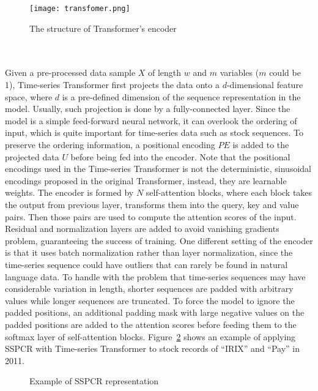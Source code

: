 \begin{figure}[!htbp]
    \centering
    \texttt{[image: transfomer.png]}
    \caption{The structure of Transformer's encoder}
    \label{fig:transformer}
\end{figure}
\\\\Given a pre-processed data sample $X$ of length $w$ and $m$ variables ($m$ could be 1), Time-series Transformer first projects the data onto a $d$-dimensional feature space, where $d$ is a pre-defined dimension of the sequence representation in the model. Usually, such projection is done by a fully-connected layer. Since the model is a simple feed-forward neural network, it can overlook the ordering of input, which is quite important for time-series data such as stock sequences. To preserve the ordering information, a positional encoding $PE$ is added to the projected data $U$ before being fed into the encoder. Note that the positional encodings used in the Time-series Transformer is not the deterministic, sinusoidal encodings proposed in the original Transformer, instead, they are learnable weights. The encoder is formed by $N$ self-attention blocks, where each block takes the output from previous layer, transforms them into the query, key and value pairs. Then those pairs are used to compute the attention scores of the input. Residual and normalization layers are added to avoid vanishing gradients problem, guaranteeing the success of training. One different setting of the encoder is that it uses batch normalization rather than layer normalization, since the time-series sequence could have outliers that can rarely be found in natural language data. To handle with the problem that time-series sequences may have considerable variation in length, shorter sequences are padded with arbitrary values while longer sequences are truncated. To force the model to ignore the padded positions, an additional padding mask with large negative values on the padded positions are added to the attention scores before feeding them to the softmax layer of self-attention blocks. Figure~\ref{fig:irixpaysspcr} shows an example of applying SSPCR with Time-series Transformer to stock records of ``IRIX'' and ``Pay'' in 2011.
\begin{figure}[!htbp]
    \centering 
    \caption{ Example of SSPCR representation } 
    \label{fig:irixpaysspcr} 
\end{figure} 

